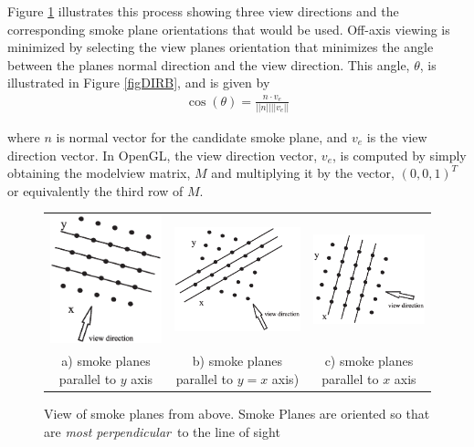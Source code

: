 \documentclass[11pt,twoside]{book}
\begin{document}
Figure \ref{figDIRA} illustrates this process showing three view directions and the corresponding smoke plane orientations that would be used.
Off-axis viewing is minimized by selecting the view planes orientation that minimizes the angle between the planes normal direction and the view direction.
This angle, $\theta$, is illustrated in Figure \ref{figDIRB}, and is given by
\begin{eqnarray*}
\cos(\theta)=\frac{n\cdot v_e}{||n||||v_e||}
\end{eqnarray*}

\noindent where $n$ is normal vector for the candidate smoke plane, and $v_e$ is
the view direction vector.  In OpenGL, the view direction vector,
$v_e$, is computed by simply obtaining the modelview matrix, $M$
and multiplying it by the vector, $(0,0,1)^T$ or equivalently the
third row of $M$.

\begin{figure}
\begin{tabular}{ccc}
\includegraphics[width=2.0in]{figures/figDIRA2}&
\includegraphics[width=2.0in]{figures/figDIRA3}&
\includegraphics[width=2.0in]{figures/figDIRA1}\\
a) smoke planes parallel to $y$ axis& b) smoke planes parallel to
$y=x$ axis)&
c) smoke planes parallel to $x$ axis\\
\end{tabular}
\caption{View of smoke planes from above.  Smoke Planes are
oriented so that are {\em most perpendicular}\ to the line of sight }
\label{figDIRA}
\end{figure}
\end{document}
